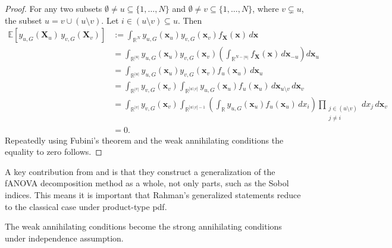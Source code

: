 \begin{proof}
For any two subsets $\emptyset \ne u \subseteq \{1,\dots,N\}$ and $\emptyset \ne v \subseteq \{1,\dots,N\}$, where $v \subsetneq u$, the subset $u = v \cup (u \setminus v)$. Let $i \in (u \setminus v) \subseteq u$. Then
\begin{align*}
\mathbb{E}[y_{u,G}(\mathbf{X}_u) \, y_{v,G}(\mathbf{X}_v)]
&:= \int_{\mathbb{R}^N} y_{u,G}(\mathbf{x}_u) y_{v,G}(\mathbf{x}_v) f_{\mathbf{X}}(\mathbf{x}) \, d\mathbf{x} \\
&= \int_{\mathbb{R}^{|u|}} y_{u,G}(\mathbf{x}_u) y_{v,G}(\mathbf{x}_v) \left( \int_{\mathbb{R}^{N - |u|}} f_{\mathbf{X}}(\mathbf{x}) \, d\mathbf{x}_{-u} \right) d\mathbf{x}_u \\
&= \int_{\mathbb{R}^{|u|}} y_{u,G}(\mathbf{x}_u) y_{v,G}(\mathbf{x}_v) f_u(\mathbf{x}_u) \, d\mathbf{x}_u \\
&= \int_{\mathbb{R}^{|v|}} y_{v,G}(\mathbf{x}_v)
    \int_{\mathbb{R}^{|u \setminus v|}} y_{u,G}(\mathbf{x}_u) f_u(\mathbf{x}_u) \, d\mathbf{x}_{u \setminus v} \, d\mathbf{x}_v \\
&= \int_{\mathbb{R}^{|v|}} y_{v,G}(\mathbf{x}_v)
    \int_{\mathbb{R}^{|u \setminus v| - 1}} \left( \int_{\mathbb{R}} y_{u,G}(\mathbf{x}_u) f_u(\mathbf{x}_u) \, dx_i \right)
    \prod_{\substack{j \in (u \setminus v) \\ j \ne i}} dx_j \, d\mathbf{x}_v \\
&= 0.
\end{align*}
Repeatedly using Fubini's theorem and the weak annihilating conditions the equality to zero follows.
\end{proof}

A key contribution from \cite{hooker2007} and \cite{rahman2014} is that they construct a generalization of the fANOVA decomposition method as a whole, not only parts, such as the Sobol indices.
This means it is important that Rahman's generalized statements reduce to the classical case under product-type pdf.
\begin{proposition}
    The weak annihilating conditions become the strong annihilating conditions under independence assumption.
    \label{prop:weak_strong}
\end{proposition}

